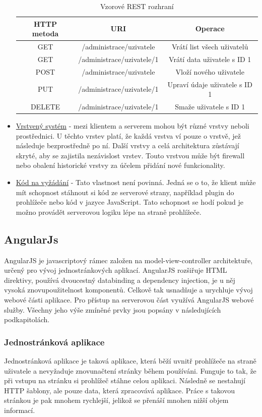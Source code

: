 \documentclass[czech,master,public,dept460,male,cpdeclaration,twoside]{diploma}
\begin{document}
\begin{itemize}
\begin{table}[H]
	\centering
	\caption{Vzorové REST rozhraní}
	\label{tab:REST}
	\begin{tabular}{|c|c|c|}
		\hline
		{\bf HTTP metoda} & {\bf URI} & {\bf Operace} \\
		\hline
		GET & /administrace/uzivatele & Vrátí list všech uživatelů \\
		\hline
		GET & /administrace/uzivatele/1 & Vrátí data uživatele s ID 1 \\
		\hline
		POST & /administrace/uzivatele & Vloží nového uživatele \\
		\hline
		PUT & /administrace/uzivatele/1 & Upraví údaje uživatele s ID 1 \\
		\hline
		DELETE & /administrace/uzivatele/1 & Smaže uživatele s ID 1 \\
		\hline
	\end{tabular}
\end{table}
	\item \underline{Vrstvený systém} - mezi klientem a serverem mohou být různé vrstvy neboli prostřednici. U těchto vrstev platí, že každá vrstva ví pouze o vrstvě, jež následuje bezprostředně po ní. Další vrstvy a celá architektura zůstávají skryté, aby se zajistila nezávislost vrstev. Touto vrstvou může být firewall nebo obalení historické vrstvy za účelem přidání nové funkcionality. 
	\item \underline{Kód na vyžádání} - Tato vlastnost není povinná. Jedná se o to, že klient může mít schopnost stáhnout si kód ze serverové strany, například plugin do prohlížeče nebo kód v jazyce JavaScript. Tato schopnost se hodí pokud je možno provádět serverovou logiku lépe na straně prohlížeče.
\end{itemize}
	
\subsection{AngularJs}
AngularJS je javascriptový rámec založen na model-view-controller architektuře, určený pro vývoj jednostránkových aplikací. AngularJS rozšiřuje HTML direktivy, používá dvoucestný databinding a dependency injection, je u něj vysoká znovupoužitelnost komponentů. Celkově tak usnadňuje a urychluje vývoj webové části aplikace. Pro přístup na serverovou část využívá AngularJS webové služby. Všechny jeho výše zmíněné prvky jsou popsány v následujících podkapitolách. \cite{coJeAngular} \cite{angulartutorial}

\subsubsection{Jednostránková aplikace}
Jednostránková aplikace je taková aplikace, která běží uvnitř prohlížeče na straně uživatele a nevyžaduje znovunačtení stránky během používáni. Funguje to tak, že při vstupu na stránku si prohlížeč stáhne celou aplikaci. Následně se nestahují HTTP šablony, ale pouze data, která zpracovává aplikace. Práce s takovou stránkou je pak mnohem rychlejší, jelikož se přenáší mnohen nižší objem informací. \cite{SPA}
\end{document}
